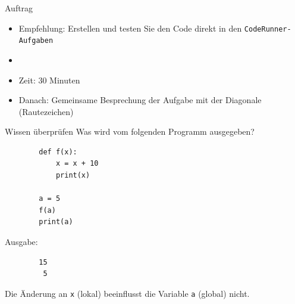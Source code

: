 \begin{frame}[fragile]{Auftrag}%
    \begin{itemize}
        \item Empfehlung: Erstellen und testen Sie den Code direkt in den \texttt{CodeRunner-Aufgaben}
        \item {}
        \item Zeit: 30 Minuten
        \item Danach: Gemeinsame Besprechung der Aufgabe mit der Diagonale (Rautezeichen)
    \end{itemize}
\end{frame}

\begin{frame}[fragile]{Wissen überprüfen}
    Was wird vom folgenden Programm ausgegeben?
    \begin{lstlisting}
        def f(x):
            x = x + 10
            print(x)

        a = 5
        f(a)
        print(a)
    \end{lstlisting}
    \pause
    \vspace{0.3cm}
    Ausgabe: 
    \begin{lstlisting}
        15
         5
    \end{lstlisting}
    Die Änderung an \lstinline{x} (lokal) beeinflusst die Variable \lstinline{a} (global) nicht.
\end{frame}
